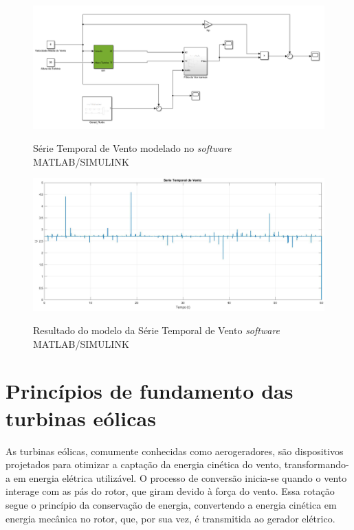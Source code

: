     \begin{figure}[h]
        \centering
        \caption{Série Temporal de Vento modelado no \textit{software} MATLAB/SIMULINK}
        \includegraphics[width=1\textwidth]{Figuras/Teorico/SerieTemporaldeVento.png}
        \label{fig:SérieTemporal}    
    \end{figure}
    
    \begin{figure}[h]
        \centering
        \caption{Resultado do modelo da Série Temporal de Vento \textit{software} MATLAB/SIMULINK}
        \includegraphics[width=1\textwidth]{Figuras/Teorico/serie temporal de vento_.png}
        \label{fig:SérieTemporal_resultado}    
    \end{figure}










\section{Princípios de fundamento das turbinas eólicas} %
\par As turbinas eólicas, comumente conhecidas como aerogeradores, são dispositivos projetados para otimizar a captação da energia cinética do vento, transformando-a em energia elétrica utilizável. O processo de conversão inicia-se quando o vento interage com as pás do rotor, que giram devido à força do vento. Essa rotação segue o princípio da conservação de energia, convertendo a energia cinética em energia mecânica no rotor, que, por sua vez, é transmitida ao gerador elétrico.

